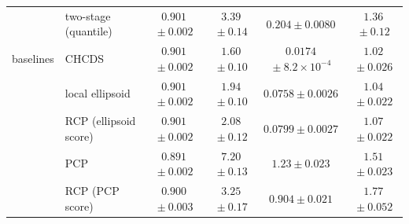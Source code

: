 \begin{table}[!t]
{\begin{tabular}{llcccc}
 & two-stage (quantile) & $0.901${\scriptsize${}\pm0.002$} & $3.39${\scriptsize${}\pm0.14$} & $0.204${\scriptsize${}\pm0.0080$} & $1.36${\scriptsize${}\pm0.12$}\\
\addlinespace[2pt]
baselines & CHCDS & $0.901${\scriptsize${}\pm0.002$} & $1.60${\scriptsize${}\pm0.10$} & $0.0174${\scriptsize${}\pm8.2\times10^{-4}$} & $1.02${\scriptsize${}\pm0.026$}\\
 & local ellipsoid & $0.901${\scriptsize${}\pm0.002$} & $1.94${\scriptsize${}\pm0.10$} & $0.0758${\scriptsize${}\pm0.0026$} & $1.04${\scriptsize${}\pm0.022$}\\
 & RCP (ellipsoid score) & $0.901${\scriptsize${}\pm0.002$} & $2.08${\scriptsize${}\pm0.12$} & $0.0799${\scriptsize${}\pm0.0027$} & $1.07${\scriptsize${}\pm0.022$}\\
 & PCP & $0.891${\scriptsize${}\pm0.002$} & $7.20${\scriptsize${}\pm0.13$} & $1.23${\scriptsize${}\pm0.023$} & $1.51${\scriptsize${}\pm0.023$}\\
 & RCP (PCP score) & $0.900${\scriptsize${}\pm0.003$} & $3.25${\scriptsize${}\pm0.17$} & $0.904${\scriptsize${}\pm0.021$} & $1.77${\scriptsize${}\pm0.052$}\\
\bottomrule
\end{tabular}}
\end{table}
